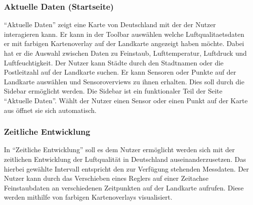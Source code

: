\subsubsection{Aktuelle Daten (Startseite)}

\enquote{Aktuelle Daten} zeigt eine Karte von Deutschland mit der der Nutzer interagieren kann. 
Er kann in der \gls{Toolbar} auswählen welche \gls{Luftqualitaetsdaten} er mit farbigen \gls{Kartenoverlay} auf der Landkarte angezeigt haben möchte. 
Dabei hat er die Auswahl zwischen Daten zu \gls{Feinstaub}, Lufttemperatur, Luftdruck und Luftfeuchtigkeit.
Der Nutzer kann Städte durch den Stadtnamen oder die Postleitzahl auf der Landkarte suchen. Er kann Sensoren oder Punkte auf der Landkarte auswählen und \glspl{Sensoroverview} zu ihnen erhalten. Dies soll durch die \gls{Sidebar} ermöglicht werden.
Die \gls{Sidebar} ist ein funktionaler Teil der Seite \enquote{Aktuelle Daten}. Wählt der Nutzer einen \gls{Sensor} oder einen Punkt auf der Karte aus öffnet sie sich automatisch.



\subsubsection{Zeitliche Entwicklung}

In \enquote{Zeitliche Entwicklung} soll es dem Nutzer ermöglicht werden sich mit der zeitlichen Entwicklung der Luftqualität in Deutschland auseinanderzusetzen. Das hierbei gewählte Intervall entspricht den zur Verfügung stehenden Messdaten.
Der Nutzer kann durch das Verschieben eines Reglers auf einer Zeitachse \gls{Feinstaub}daten an verschiedenen Zeitpunkten auf der Landkarte aufrufen. Diese werden mithilfe von farbigen \glspl{Kartenoverlay} visualisiert.
\\
\\

